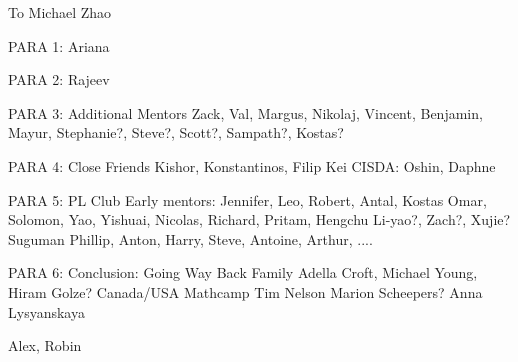 To Michael Zhao

PARA 1: Ariana

PARA 2: Rajeev

PARA 3: Additional Mentors
Zack, Val, Margus, Nikolaj, Vincent, Benjamin, Mayur, Stephanie?, Steve?, Scott?, Sampath?, Kostas?

PARA 4: Close Friends
Kishor, Konstantinos, Filip
Kei
CISDA: Oshin, Daphne

PARA 5: PL Club
Early mentors: Jennifer, Leo, Robert, Antal, Kostas
Omar, Solomon, Yao, Yishuai, Nicolas, Richard, Pritam, Hengchu
Li-yao?, Zach?, Xujie?
Suguman
Phillip, Anton, Harry, Steve, Antoine, Arthur, ....

PARA 6: Conclusion: Going Way Back
Family
Adella Croft, Michael Young, Hiram Golze?
Canada/USA Mathcamp
Tim Nelson
Marion Scheepers?
Anna Lysyanskaya

Alex, Robin
